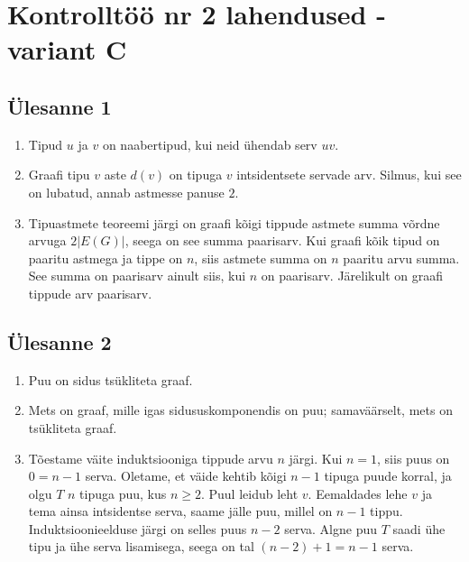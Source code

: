 \documentclass[11pt,a4paper]{article}
\newcommand{\yl}[1]{\subsection*{Ülesanne #1}}
\newcommand{\variant}[1]{\newpage\section*{Kontrolltöö nr 2 lahendused - variant #1}}
\begin{document}
\variant{C}

\yl{1}
\begin{enumerate}[label=\alph*.]
\item Tipud $u$ ja $v$ on naabertipud, kui neid ühendab serv $uv$.
\item Graafi tipu $v$ aste $d(v)$ on tipuga $v$ intsidentsete servade arv. Silmus, kui see on lubatud, annab astmesse panuse $2$.
\item Tipuastmete teoreemi järgi on graafi kõigi tippude astmete summa võrdne arvuga $2|E(G)|$, seega on see summa paarisarv. Kui graafi kõik tipud on paaritu astmega ja tippe on $n$, siis astmete summa on $n$ paaritu arvu summa. See summa on paarisarv ainult siis, kui $n$ on paarisarv. Järelikult on graafi tippude arv paarisarv.
\end{enumerate}

\yl{2}
\begin{enumerate}[label=\alph*.]
\item Puu on sidus tsükliteta graaf.
\item Mets on graaf, mille igas sidususkomponendis on puu; samaväärselt, mets on tsükliteta graaf.
\item Tõestame väite induktsiooniga tippude arvu $n$ järgi. Kui $n=1$, siis puus on $0=n-1$ serva. Oletame, et väide kehtib kõigi $n-1$ tipuga puude korral, ja olgu $T$ $n$ tipuga puu, kus $n\ge 2$. Puul leidub leht $v$. Eemaldades lehe $v$ ja tema ainsa intsidentse serva, saame jälle puu, millel on $n-1$ tippu. Induktsioonieelduse järgi on selles puus $n-2$ serva. Algne puu $T$ saadi ühe tipu ja ühe serva lisamisega, seega on tal $(n-2)+1=n-1$ serva.
\end{enumerate}
\end{document}
